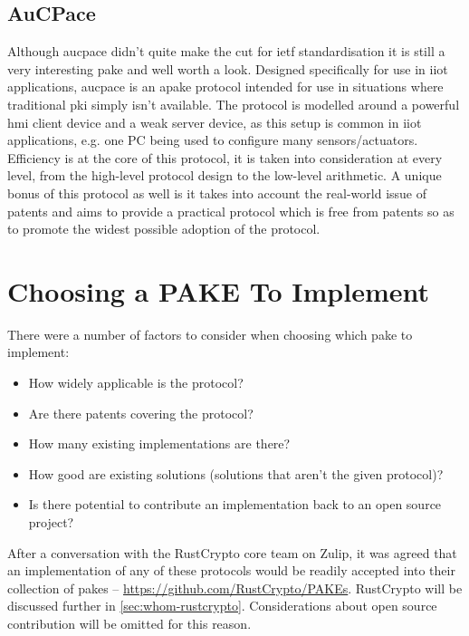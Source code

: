 \subsection{AuCPace}
Although \gls{aucpace} \cite{aucpace} didn't quite make the cut for \gls{ietf} standardisation it is still a very interesting \gls{pake} and well worth a look.
Designed specifically for use in \gls{iiot} applications, \gls{aucpace} is an \gls{apake} protocol intended for use in situations where traditional \gls{pki} simply isn't available.
The protocol is modelled around a powerful \gls{hmi} client device and a weak server device, as this setup is common in \gls{iiot} applications, e.g. one PC being used to configure many sensors/actuators.
Efficiency is at the core of this protocol, it is taken into consideration at every level, from the high-level protocol design to the low-level arithmetic.
A unique bonus of this protocol as well is it takes into account the real-world issue of patents and aims to provide a practical protocol which is free from patents so as to promote the widest possible adoption of the protocol.

\clearpage
\section{Choosing a PAKE To Implement}
There were a number of factors to consider when choosing which \gls{pake} to implement:
\begin{itemize}
  \item{How widely applicable is the protocol?}
  \item{Are there patents covering the protocol?}
  \item{How many existing implementations are there?}
  \item{How good are existing solutions (solutions that aren't the given protocol)?}
  \item{Is there potential to contribute an implementation back to an open source project?}
\end{itemize}

After a conversation with the RustCrypto core team on Zulip, it was agreed that an implementation of any of these protocols would be readily accepted into their collection of \glspl{pake} -- \url{https://github.com/RustCrypto/PAKEs}.
RustCrypto will be discussed further in \cref{sec:whom-rustcrypto}.
Considerations about open source contribution will be omitted for this reason.

